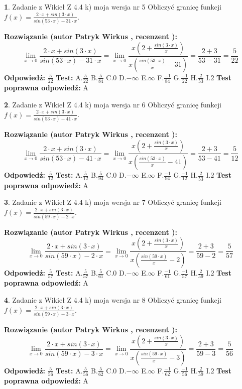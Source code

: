 \documentclass[12pt, a4paper]{article}
\theoremstyle{definition} %
\newtheorem{zad}{}
\newcommand{\zadStart}[1]{\begin{zad}#1\newline}
\newcommand{\zadStop}{\end{zad}}
\newcommand{\rozwStart}[2]{\noindent \textbf{Rozwiązanie (autor #1 , recenzent #2): }\newline}
\newcommand{\rozwStop}{\newline}
\newcommand{\odpStart}{\noindent \textbf{Odpowiedź:}\newline}
\newcommand{\odpStop}{\newline}
\newcommand{\testStart}{\noindent \textbf{Test:}\newline}
\newcommand{\testStop}{\newline}
\newcommand{\kluczStart}{\noindent \textbf{Test poprawna odpowiedź:}\newline}
\newcommand{\kluczStop}{\newline}
\begin{document}
\zadStart{Zadanie z Wikieł Z 4.4 k) moja wersja nr 5}
Obliczyć granicę funkcji $f(x)=\frac{2\cdot x +sin(3\cdot x)}{sin(53\cdot x) -31\cdot x}$.
\zadStop
\rozwStart{Patryk Wirkus}{}
$$\lim\limits_{x\to 0}\frac{2\cdot x +sin(3\cdot x)}{sin(53\cdot x) -31\cdot x}
=\lim\limits_{x\to 0}\frac{x(2+\frac{sin(3\cdot x)}{x})}{x(\frac{sin(53\cdot x)}{x}-31)}
=\frac{2+3}{53-31} = \frac{5}{22}$$
\rozwStop
\odpStart
$\frac{5}{22}$
\odpStop
\testStart
A.$\frac{5}{22}$
B.$\frac{5}{84}$
C.$0$
D.$-\infty$
E.$\infty$
F.$\frac{-1}{84}$
G.$\frac{-1}{22}$
H.$\frac{2}{53}$
I.$2$
\testStop
\kluczStart
A
\kluczStop



\zadStart{Zadanie z Wikieł Z 4.4 k) moja wersja nr 6}
Obliczyć granicę funkcji $f(x)=\frac{2\cdot x +sin(3\cdot x)}{sin(53\cdot x) -41\cdot x}$.
\zadStop
\rozwStart{Patryk Wirkus}{}
$$\lim\limits_{x\to 0}\frac{2\cdot x +sin(3\cdot x)}{sin(53\cdot x) -41\cdot x}
=\lim\limits_{x\to 0}\frac{x(2+\frac{sin(3\cdot x)}{x})}{x(\frac{sin(53\cdot x)}{x}-41)}
=\frac{2+3}{53-41} = \frac{5}{12}$$
\rozwStop
\odpStart
$\frac{5}{12}$
\odpStop
\testStart
A.$\frac{5}{12}$
B.$\frac{5}{94}$
C.$0$
D.$-\infty$
E.$\infty$
F.$\frac{-1}{94}$
G.$\frac{-1}{12}$
H.$\frac{2}{53}$
I.$2$
\testStop
\kluczStart
A
\kluczStop



\zadStart{Zadanie z Wikieł Z 4.4 k) moja wersja nr 7}
Obliczyć granicę funkcji $f(x)=\frac{2\cdot x +sin(3\cdot x)}{sin(59\cdot x) -2\cdot x}$.
\zadStop
\rozwStart{Patryk Wirkus}{}
$$\lim\limits_{x\to 0}\frac{2\cdot x +sin(3\cdot x)}{sin(59\cdot x) -2\cdot x}
=\lim\limits_{x\to 0}\frac{x(2+\frac{sin(3\cdot x)}{x})}{x(\frac{sin(59\cdot x)}{x}-2)}
=\frac{2+3}{59-2} = \frac{5}{57}$$
\rozwStop
\odpStart
$\frac{5}{57}$
\odpStop
\testStart
A.$\frac{5}{57}$
B.$\frac{5}{61}$
C.$0$
D.$-\infty$
E.$\infty$
F.$\frac{-1}{61}$
G.$\frac{-1}{57}$
H.$\frac{2}{59}$
I.$2$
\testStop
\kluczStart
A
\kluczStop



\zadStart{Zadanie z Wikieł Z 4.4 k) moja wersja nr 8}
Obliczyć granicę funkcji $f(x)=\frac{2\cdot x +sin(3\cdot x)}{sin(59\cdot x) -3\cdot x}$.
\zadStop
\rozwStart{Patryk Wirkus}{}
$$\lim\limits_{x\to 0}\frac{2\cdot x +sin(3\cdot x)}{sin(59\cdot x) -3\cdot x}
=\lim\limits_{x\to 0}\frac{x(2+\frac{sin(3\cdot x)}{x})}{x(\frac{sin(59\cdot x)}{x}-3)}
=\frac{2+3}{59-3} = \frac{5}{56}$$
\rozwStop
\odpStart
$\frac{5}{56}$
\odpStop
\testStart
A.$\frac{5}{56}$
B.$\frac{5}{62}$
C.$0$
D.$-\infty$
E.$\infty$
F.$\frac{-1}{62}$
G.$\frac{-1}{56}$
H.$\frac{2}{59}$
I.$2$
\testStop
\kluczStart
A
\kluczStop
\end{document}
